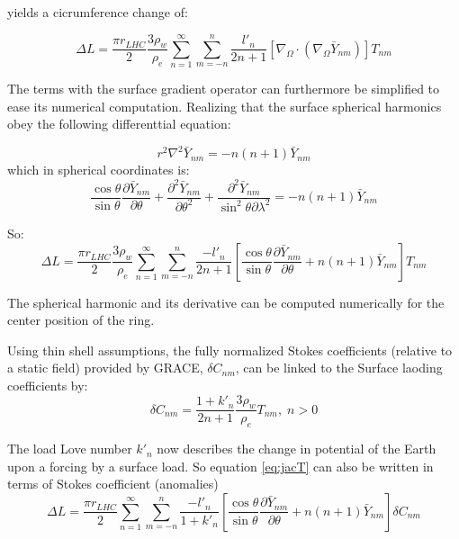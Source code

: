 \documentclass[a4paper,10pt,twoside,openany]{article}
\begin{document}
yields a cicrumference change of:

\begin{equation}
  \Delta L =\frac{\pi r_{LHC}}{2} \frac{3\rho_{w}}{\rho_{e}}\sum_{n=1}^{\infty}\sum_{m=-n}^{n}\frac{l'_{n}}{2n+1}\left[\nabla_{\Omega} \cdot
  (\nabla_{\Omega} \bar{Y}_{nm})\right]T_{nm}
\end{equation}

The terms with the surface gradient operator can furthermore be
simplified to ease its numerical computation. Realizing that the
surface spherical harmonics obey the following differenttial equation:

\begin{equation}
  r^{2}\nabla^{2} \bar{Y}_{nm}= -n(n+1)\bar{Y}_{nm}
\end{equation}
which in spherical coordinates is:
\begin{equation}
  \frac{\cos\theta}{\sin\theta}\frac{\partial \bar{Y}_{nm}}{\partial
    \theta}+\frac{\partial^{2}\bar{Y}_{nm}}{\partial\theta^{2}}+\frac{\partial^{2} \bar{Y}_{nm}}{\sin^{2}\theta\partial \lambda^{2}}= -n(n+1)\bar{Y}_{nm}
\end{equation}

So:
\begin{equation}
  \Delta L =\frac{\pi r_{LHC}}{2}
  \frac{3\rho_{w}}{\rho_{e}}\sum_{n=1}^{\infty}\sum_{m=-n}^{n}\frac{-l'_{n}}{2n+1}\left[
    \frac{\cos\theta}{\sin\theta}\frac{\partial \bar{Y}_{nm}}{\partial
      \theta} +n(n+1)\bar{Y}_{nm}\right]T_{nm}
  \label{eq:jacT}
\end{equation}



The spherical harmonic and its derivative can be computed numerically
for the center position of the ring.

Using thin shell assumptions, the fully normalized Stokes coefficients (relative to a
static field) provided by
GRACE, $\delta C_{nm}$, can be linked to the Surface laoding
coefficients by:
\begin{equation}
\delta C_{nm} = \frac{1+k'_{n}}{2n+1}\frac{3\rho_{w}}{\rho_{e}}
T_{nm},\; n>0
\end{equation}

The load Love number $k'_{n}$ now describes the change in potential of
the Earth upon a forcing by a surface load.
So equation \ref{eq:jacT} can also be written in terms of Stokes
coefficient (anomalies)
\begin{equation}
  \Delta L =\frac{\pi r_{LHC}}{2}
  \sum_{n=1}^{\infty}\sum_{m=-n}^{n}\frac{-l'_{n}}{1+k'_{n}}\left[
    \frac{\cos\theta}{\sin\theta}\frac{\partial \bar{Y}_{nm}}{\partial
    \theta} +n(n+1)\bar{Y}_{nm}\right]\delta C_{nm}
\label{eq:jacpot}
\end{equation}
\end{document}
